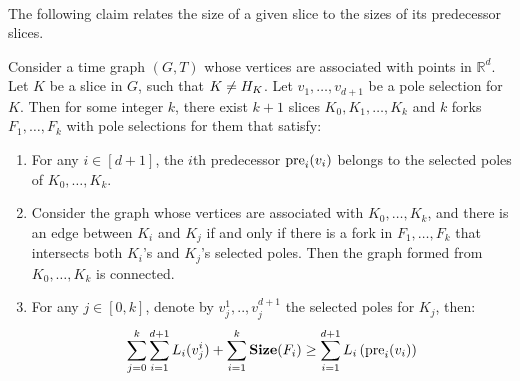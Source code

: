  \paragraph{}  The following claim relates the size of a given slice to the sizes of its predecessor slices.
  \begin{claim}
    \label{claim:prevslices}
Consider a time graph $(G,T)$ whose vertices are associated with points in $\mathbb{R}^{d}$. Let $K$ be a slice in $G$, such that $K \neq H_{K}$. Let $v_{1}, \ldots, v_{d+1}$ be a pole selection for $K$. Then for some integer $k$, there exist $k+1$ slices $K_{0}, K_{1}, \ldots, K_{k}$ and $k$ forks $F_{1}, \ldots, F_{k}$ with pole selections for them that satisfy:
    \begin{enumerate}
      \item For any $i \in [d+1]$,  the $i$th predecessor $\text{pre}_{i}(v_{i}) $ belongs to the selected poles of $K_{0}, \ldots, K_{k}$.
      \item Consider the graph whose vertices are associated with $K_{0}, \ldots, K_{k}$, and there is an edge between $K_{i}$ and $K_{j}$ if and only if there is a fork in $F_{1}, \ldots, F_{k}$ that intersects both $K_{i}$'s and $K_{j}$'s selected poles. Then the graph formed from $K_{0}, \ldots, K_{k}$ is connected.
      \item  For any $j\in [0,k]$, denote by $v_{j}^{1},..,v_{j}^{d+1}$ the selected poles for $K_{j}$, then:  
        \begin{equation*}
          \begin{split}
            \sum_{j=0}^{k}\sum_{i=1}^{d+1}L_{i}(v_{j}^{i}) +  \sum^{k}_{i=1}\mathbf{Size}(F_{i}) \ge \sum_{i=1}^{d+1}L_{i}\left( \text{pre}_{i}(v_{i}) \right) 
          \end{split}
        \end{equation*}
        
    \end{enumerate}
  \end{claim}
